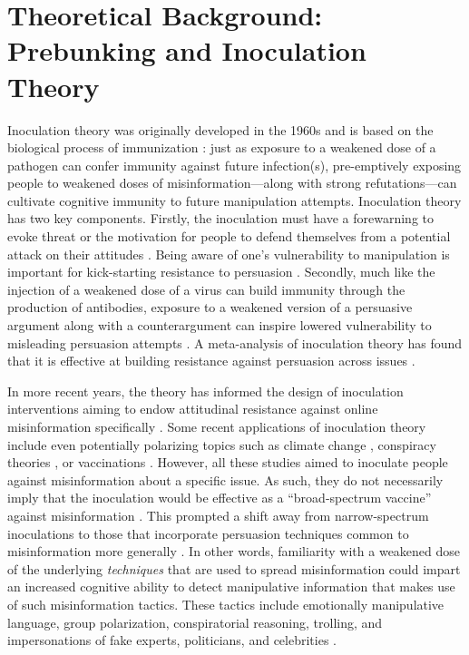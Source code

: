 \documentclass[empirical, authordate, issue]{jote-new-article}
\begin{document}
\section{Theoretical Background: Prebunking and Inoculation Theory}

Inoculation theory was originally developed in the 1960s and is based on the biological process of immunization \parencite{McGuire1964, McGuire1961}: just as exposure to a weakened dose of a pathogen can confer immunity against future infection(s), pre-emptively exposing people to weakened doses of misinformation—along with strong refutations—can cultivate cognitive immunity to future manipulation attempts. Inoculation theory has two key components. Firstly, the inoculation must have a forewarning to evoke threat or the motivation for people to defend themselves from a potential attack on their attitudes \parencite{Compton2012}. Being aware of one's vulnerability to manipulation is important for kick-starting resistance to persuasion \parencite{Sagarin2002}. Secondly, much like the injection of a weakened dose of a virus can build immunity through the production of antibodies, exposure to a weakened version of a persuasive argument along with a counterargument can inspire lowered vulnerability to misleading persuasion attempts \parencite{McGuire1961}. A meta-analysis of inoculation theory has found that it is effective at building resistance against persuasion across issues \parencite{Banas2010}.

In more recent years, the theory has informed the design of inoculation interventions aiming to endow attitudinal resistance against online misinformation specifically \parencite[for in-depth reviews see][]{Compton2021a, Lewandowsky2021, Roozenbeek2018, vanderLinden2022}. Some recent applications of inoculation theory include even potentially polarizing topics such as climate change \parencite{vanderLinden2017}, conspiracy theories \parencite{Banas2013}, or vaccinations \parencite{Jolley2017}. However, all these studies aimed to inoculate people against misinformation about a specific issue. As such, they do not necessarily imply that the inoculation would be effective as a “broad-spectrum vaccine” against misinformation \parencite{Roozenbeek2018}. This prompted a shift away from narrow-spectrum inoculations to those that incorporate persuasion techniques common to misinformation more generally \parencite{Cook2017, Roozenbeek2019}. In other words, familiarity with a weakened dose of the underlying \emph{techniques} that are used to spread misinformation could impart an increased cognitive ability to detect manipulative information that makes use of such misinformation tactics. These tactics include emotionally manipulative language, group polarization, conspiratorial reasoning, trolling, and impersonations of fake experts, politicians, and celebrities \parencite{Roozenbeek2019}.
\end{document}
